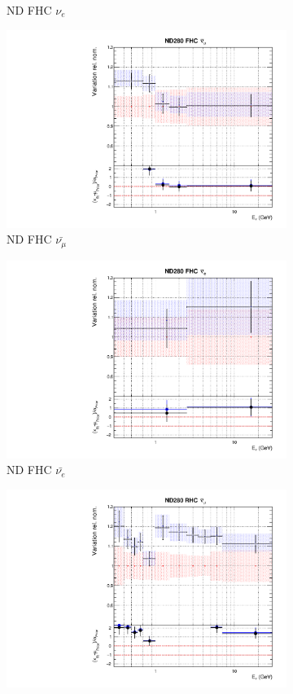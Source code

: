 \begin{figure}
\begin{subfigure}{0.24\textwidth}
  \caption{ND FHC $\nu_e$}
\end{subfigure}
\begin{subfigure}{0.24\textwidth}
  \centering
  \includegraphics[width=0.95\linewidth]{figs/fixed2p2hflux2}
  \caption{ND FHC $\bar{\nu_{\mu}}$}
\end{subfigure}
\begin{subfigure}{0.24\textwidth}
  \centering
  \includegraphics[width=0.95\linewidth]{figs/fixed2p2hflux3}
  \caption{ND FHC $\bar{\nu_{e}}$}
\end{subfigure}
\begin{subfigure}{0.24\textwidth}
  \centering
  \includegraphics[width=0.95\linewidth]{figs/fixed2p2hflux4}

\end{subfigure}
\end{figure}
